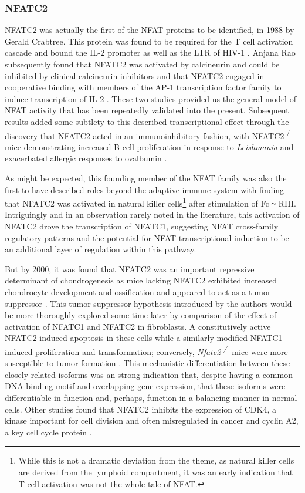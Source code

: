 \subsubsection{NFATC2}\label{nfatc2}

NFATC2 was actually the first of the NFAT proteins to be identified, in 1988 by Gerald Crabtree. This protein was found to be required for the T cell activation cascade and bound the IL\hyp{}2 promoter as well as the LTR of HIV\hyp{}1 \citep{Shaw1988}. Anjana Rao subsequently found that NFATC2 was activated by calcineurin and could be inhibited by clinical calcineurin inhibitors and that NFATC2 engaged in cooperative binding with members of the AP\hyp{}1 transcription factor family to induce transcription of IL\hyp{}2 \citep{Jain1993}. These two studies provided us the general model of NFAT activity that has been repeatedly validated into the present. Subsequent results added some subtlety to this described transcriptional effect through the discovery that NFATC2 acted in an immunoinhibitory fashion, with NFATC2\textsuperscript{\hyp{}/\hyp{}} mice demonstrating increased B cell proliferation in response to \textit{Leishmania} and exacerbated allergic responses to ovalbumin \citep{Xanthoudakis1996}. 

As might be expected, this founding member of the NFAT family was also the first to have described roles beyond the adaptive immune system with \citet{Aramburu1995} finding that NFATC2 was activated in natural killer cells\footnote{While this is not a dramatic deviation from the theme, as natural killer cells are derived from the lymphoid compartment, it was an early indication that T cell activation was not the whole tale of NFAT.} after stimulation of Fc$\upgamma$RIII. Intriguingly and in an observation rarely noted in the literature, this activation of NFATC2 drove the transcription of NFATC1, suggesting NFAT cross\hyp{}family regulatory patterns and the potential for NFAT transcriptional induction to be an additional layer of regulation within this pathway.

But by 2000, it was found that NFATC2 was an important repressive determinant of chondrogenesis as mice lacking NFATC2 exhibited increased chondrocyte development and ossification and appeared to act as a tumor suppressor \citep{Ranger2000}. This tumor suppressor hypothesis introduced by the authors would be more thoroughly explored some time later by comparison of the effect of activation of NFATC1 and NFATC2 in fibroblasts. A constitutively active NFATC2 induced apoptosis in these cells while a similarly modified NFATC1 induced proliferation and transformation; conversely, \textit{Nfatc2\textsuperscript{\hyp{}/\hyp{}}} mice were more susceptible to tumor formation \citep{Robbs2008}. This mechanistic differentiation between these closely related isoforms was an strong indication that, despite having a common DNA binding motif and overlapping gene expression, that these isoforms were differentiable in function and, perhaps, function in a balancing manner in normal cells. Other studies found that NFATC2 inhibits the expression of CDK4, a kinase important for cell division and often misregulated in cancer \citep{Baksh2002, OLeary2016} and cyclin A2, a key cell cycle protein \citep{Carvalho2007}.    

